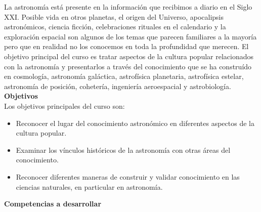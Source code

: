 \documentclass[letterpaper,10pt,onecolumn]{article}
\begin{document}

\noindent\normalsize 
La astronom\'ia est\'a presente en la informaci\'on que
recibimos a diario en el Siglo XXI. Posible vida en otros planetas, el
origen del  Universo, apocalipsis astron\'omicos, ciencia ficci\'on,
celebraciones rituales en el calendario y la exploraci\'on espacial
son algunos de los temas que parecen familiares a la mayor\'ia pero que
en realidad no los conocemos en toda la profundidad que merecen. El
objetivo principal del curso es tratar aspectos de la cultura popular
relacionados con la astronom\'ia y presentarlos a trav\'es del
conocimiento que se ha constru\'ido en cosmolog\'ia, astronom\'ia
gal\'actica, astrof\'isica planetaria, astrof\'isica estelar,
astronom\'ia de posici\'on, coheter\'ia, ingenier\'ia aeroespacial y
astrobiolog\'ia. \\[0.1cm]  

\noindent\textbf{\large {} \quad Objetivos}\\[-0.2cm]


\noindent\normalsize Los objetivos principales del curso son:

\begin{itemize}
\item Reconocer el lugar del conocimiento astron\'omico en diferentes
  aspectos de la cultura popular. \\[-0.6cm] 

\item Examinar los v\'inculos hist\'oricos de la astronom\'ia con
  otras \'areas del conocimiento.  \\[-0.6cm] 

\item Reconocer diferentes maneras de construir y validar conocimiento
  en las ciencias naturales, en particular en astronom\'ia.\\[-0.2cm]
\end{itemize}

\noindent\textbf{\large {} \quad Competencias a
  desarrollar}\\[-0.2cm] 

\end{document}
